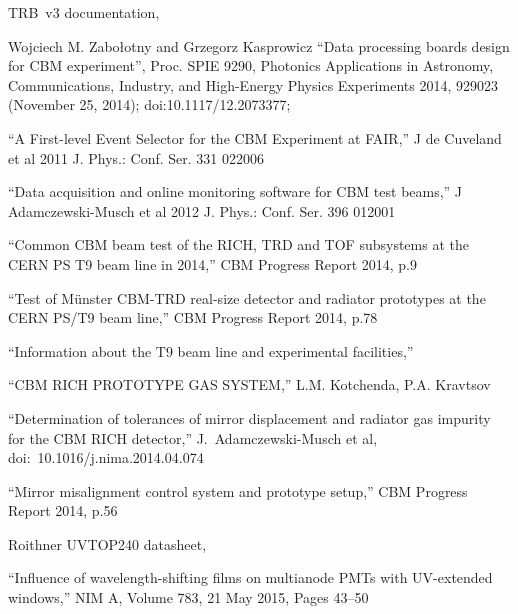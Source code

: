 \begin{thebibliography}{99}
TRB~v3 documentation,

Wojciech M. Zabołotny and Grzegorz Kasprowicz
``Data processing boards design for CBM experiment'',
Proc. SPIE 9290, Photonics Applications in Astronomy, Communications, Industry, and High-Energy Physics Experiments 2014, 929023 (November 25, 2014); doi:10.1117/12.2073377;

``A First-level Event Selector for the CBM Experiment at FAIR,''
J de Cuveland et al 2011 J. Phys.: Conf. Ser. 331 022006

``Data acquisition and online monitoring software for CBM test beams,''
J Adamczewski-Musch et al 2012 J. Phys.: Conf. Ser. 396 012001


``Common CBM beam test of the RICH, TRD and TOF subsystems at the CERN PS T9 beam line in 2014,''
CBM Progress Report 2014, p.9

``Test of M\"unster CBM-TRD real-size detector and radiator prototypes at the CERN PS/T9 beam line,''
CBM Progress Report 2014, p.78

``Information about the T9 beam line and experimental facilities,''

``CBM RICH PROTOTYPE GAS SYSTEM,''
L.M. Kotchenda, P.A. Kravtsov

``Determination of tolerances of mirror displacement and radiator gas impurity for the CBM RICH detector,''
J.~Adamczewski-Musch et al,
doi:~10.1016/j.nima.2014.04.074

``Mirror misalignment control system and prototype setup,''
CBM Progress Report 2014, p.56

Roithner UVTOP240 datasheet,

``Influence of wavelength-shifting films on multianode PMTs with UV-extended windows,''
NIM A, Volume 783, 21 May 2015, Pages 43–50


\end{thebibliography}
